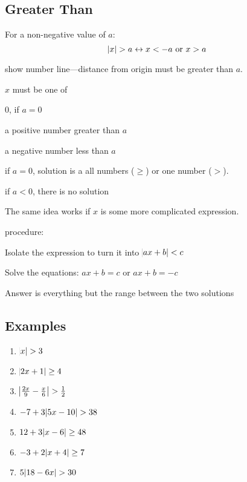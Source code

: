 \documentclass[letterpaper, landscape]{exam}
\begin{document}
  \subsection{Greater Than}
  
  For a non-negative value of $a$:
  \[
    |x| > a \leftrightarrow x < -a \text{ or } x > a \\
  \]

  \begin{itemize*}
    \item show number line---distance from origin must be greater than $a$.
    \item $x$ must be one of
      \begin{itemize*}
        \item 0, if $a = 0$
        \item a positive number greater than $a$
        \item a negative number less than $a$
      \end{itemize*}
    \item if $a = 0$, solution is a all numbers ($\geq$) or one number ($>$).
    \item if $a < 0$, there is no solution
  \end{itemize*}

  The same idea works if $x$ is some more complicated expression.

  procedure:
  \begin{enumerate*}
    \item Isolate the expression to turn it into $\abs{ ax + b } < c$
    \item Solve the equations: $ax + b = c$ or $ax + b = -c$
    \item Answer is everything but the range between the two solutions
  \end{enumerate*}

  \subsection{Examples} %
  
  \begin{enumerate}
    \item $\abs{ x } > 3$

    \item $\abs{ 2x + 1 } \geq 4$

    \item $\abs{ \frac{2x}{9} - \frac{x}{6} } > \frac{1}{2}$

    \item $-7 + 3 \abs{ 5x - 10 } > 38$

    \item $12 + 3 \abs{ x - 6 } \geq 48$

    \item $-3 + 2 \abs{ x + 4 } \geq 7$

    \item $5 \abs{ 18 - 6x } > 30$

  \end{enumerate}
\end{document}
